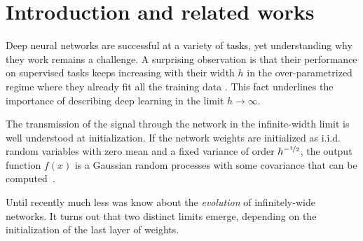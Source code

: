 \documentclass{article}
\newcommand{\mm}[1]{\textcolor{black}{#1}}
\renewcommand{\cite}[1]{\citep{#1}}
\begin{document}
\section{Introduction and related works}\label{sec:intro}

Deep neural networks are successful at a variety of \mm{tasks}, yet understanding why they work remains a challenge. 
A surprising observation is that their performance on supervised tasks keeps increasing with their width $h$ in the over-parametrized  regime where they already fit all the training data \cite{neyshabur2017geometry,bansal2018minnorm,advani2017high,Spigler18}. This fact underlines the importance of describing deep learning in the limit $h\rightarrow \infty$.


The transmission of the signal through the network in the infinite-width limit is well understood at initialization. If the network weights  are initialized as i.i.d. random variables with zero mean and a fixed variance of order $h^{-\nicefrac12}$, the output function $f(x)$ is a Gaussian random processes with some covariance that can be computed~\cite{Neal1996,williams1997computing,Lee2017,matthews2018gaussian,novak2018bayesian,yang2019scaling}. 

Until recently much less was know about the \emph{evolution} of infinitely-wide networks. It turns out that two distinct limits emerge, depending on the initialization of the last layer of weights. %
\end{document}
